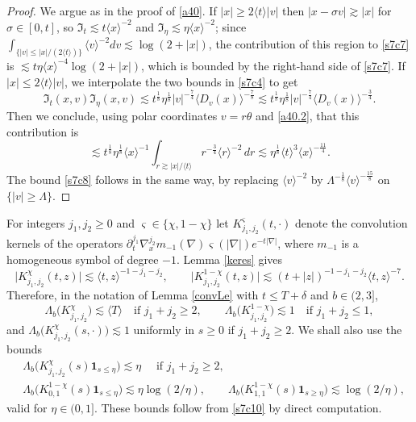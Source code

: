\documentclass[reqno,11pt]{amsart}
\numberwithin{equation}{section}
\begin{document}
	\begin{proof} We argue as in the proof of \eqref{a40}. If $|x|\geq2\langle t\rangle|v|$ then
	$|x-\sigma v|\gtrsim|x|$ for $\sigma\in[0,t]$, so $\mathfrak I_t\lesssim t\langle x\rangle^{-2}$ and
	$\mathfrak I_{\eta}\lesssim\eta\langle x\rangle^{-2}$; since
	$\int_{\{|v|\leq|x|/(2\langle t\rangle)\}}\langle v\rangle^{-2}dv\lesssim\log(2+|x|)$, the
	contribution of this region to \eqref{s7c7} is $\lesssim t\eta\langle x\rangle^{-4}\log(2+|x|)$,
	which is bounded by the right-hand side of \eqref{s7c7}. If $|x|\leq2\langle t\rangle|v|$, we
	interpolate the two bounds in \eqref{s7c4} to get
	\[
		\mathfrak I_t(x,v)\mathfrak I_{\eta}(x,v)
		\lesssim t^{\frac18}\eta^{\frac18}|v|^{-\frac74}\langle D_v(x)\rangle^{-\frac78}
		\lesssim t^{\frac18}\eta^{\frac18}|v|^{-\frac74}\langle D_v(x)\rangle^{-\frac34}.
	\]
	Then we conclude, using polar coordinates $v=r\theta$ and \eqref{a40.2}, that this
	contribution is
	\[
		\lesssim t^{\frac18}\eta^{\frac18}\langle x\rangle^{-1}
		\int_{r\gtrsim|x|/\langle t\rangle}r^{-\frac34}\langle r\rangle^{-2}\,dr
		\lesssim\eta^{\frac18}\langle t\rangle^{3}\langle x\rangle^{-\frac{11}{4}} .
	\]
	The bound \eqref{s7c8} follows in the same way, by replacing $\langle v\rangle^{-2}$ by
	$\Lambda^{-\frac{1}{8}}\langle v\rangle^{-\frac{15}{8}}$ on $\{|v|\geq\Lambda\}$.
	\end{proof}

	For integers $j_1,j_2\geq0$ and $\varsigma\in\{\chi, 1-\chi\}$ let
	$K^{\varsigma}_{j_1,j_2}(t,\cdot)$ denote the convolution kernels of the operators
	$\partial_t^{j_1}\nabla_x^{j_2}m_{-1}(\nabla)\varsigma(|\nabla|)e^{-t|\nabla|}$, where $m_{-1}$ is a homogeneous symbol of degree $-1$. Lemma \ref{keres} gives
	\begin{equation}\label{s7c10}
		\bigl|K^{\chi}_{j_1,j_2}(t,z)\bigr|\lesssim\langle t,z\rangle^{-1-j_1-j_2},
		\qquad
		\bigl|K^{1-\chi}_{j_1,j_2}(t,z)\bigr|\lesssim(t+|z|)^{-1-j_1-j_2}\langle t,z\rangle^{-7}.
	\end{equation}
	Therefore, in the notation of Lemma \ref{convLe} with $t\leq T+\delta$ and $b\in(2,3]$,
	\begin{equation}\label{s7c11}
		\Lambda_b\bigl(K^{\chi}_{j_1,j_2}\bigr)\lesssim\langle T\rangle\quad\text{if }j_1+j_2\geq2,
		\qquad
		\Lambda_b\bigl(K^{1-\chi}_{j_1,j_2}\bigr)\lesssim1\quad\text{if }j_1+j_2\leq1,
	\end{equation}
	and $\Lambda_b\bigl(K^{\chi}_{j_1,j_2}(s,\cdot)\bigr)\lesssim1$ uniformly in $s\geq0$ if
	$j_1+j_2\geq2$. We shall also use the bounds
	\begin{equation}\label{s7c12}
	\begin{split}
		&\Lambda_b\bigl(K^{\chi}_{j_1,j_2}(s)\mathbf 1_{s\leq\eta}\bigr)\lesssim\eta\quad\text{ if }j_1+j_2\geq 2,\\
		&\Lambda_b\bigl(K^{1-\chi}_{0,1}(s)\mathbf 1_{s\leq\eta}\bigr)\lesssim\eta\log(2/\eta),\qquad
		\Lambda_b\bigl(K^{1-\chi}_{1,1}(s)\mathbf 1_{s\geq\eta}\bigr)\lesssim\log(2/\eta),
		\end{split}
	\end{equation}
	valid for $\eta\in(0,1]$. These bounds follow from \eqref{s7c10} by direct computation.
	\medskip
	
\end{document}
